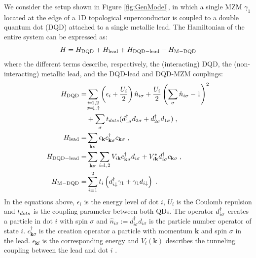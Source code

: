 \documentclass[showpacs,aps,prb,reprint,superscriptaddress]{revtex4-2}
\begin{document}
We consider the setup shown in Figure \ref{fig:GenModel}, in which a single MZM $\gamma_1$ located at the edge of a 1D topological superconductor is coupled to a double quantum dot (DQD) attached to a single metallic lead. The Hamiltonian of the entire system can be expressed as:
%
\begin{equation}
H=H_{\rm DQD}+H_{\rm lead}+H_{\rm DQD-lead}+H_{\rm M-DQD} 
\label{eq:Model}
\end{equation}
%
where the different terms describe, respectively, the (interacting) DQD, the (non-interacting) metallic lead, and the DQD-lead and DQD-MZM couplings:
\begin{align}
    H_{\rm DQD} =& \!  \sum_{\substack{i\!=\! 1,2 \\ \sigma \!=\! \dw , \up }} \left(\epsilon_{i}+\frac{U_i}{2}\right)\hat{n}_{i\sigma} + \frac{U_i}{2}\left(\sum_{\sigma} \hat{n}_{i\sigma}-1\right)^{2} \nonumber \\ 
& + \sum_{\sigma} \tdots(\dann_{1\sigma}  d_{2\sigma}+\dann_{2\sigma}  d_{1\sigma}) \; ,   \nonumber  \\ 
H_{\rm lead} =&  \sum_{\mathbf{k}\sigma }\epsilon_{\mathbf{k}}c_{\mathbf{k}\sigma}^{\dagger}c_{\mathbf{k}\sigma }  \; ,   \nonumber \\ 
H_{\rm DQD-lead} =&  \sum_{\mathbf{k}\sigma }\sum_{i\!=\!1,2 }V_{i\textbf{k}} c_{\mathbf{k}\sigma }^{\dagger}d_{i\sigma}+V^*_{i\textbf{k}} d_{i\sigma}^{\dagger}c_{\mathbf{k}\sigma } \; ,  \nonumber  \\ 
H_{\rm M-DQD} =&  \sum_{i=1}^2t_{i} \left(d_{i\downarrow}^{\dagger}\gamma_{1}+\gamma_{1}d_{i\downarrow}\right) \; .
%
\label{eq:H_DQD} 
\end{align}
%
In the equations above, $\epsilon_{i}$ is the energy level of dot $i$, $U_i$ is the Coulomb repulsion and $t_{dots}$ is the coupling parameter between both QDs. The operator $d^{\dagger}_{i\sigma}$ creates a particle in dot $i$ with spin $\sigma$ and $\hat{n}_{i\sigma}:=d_{i\sigma}^{\dagger}d_{i\sigma}$ is the particle number operator of state $i$.  $c_{\mathbf{k}\sigma }^{\dagger}$ is the creation operator a particle with momentum $\mathbf{k}$ and spin
$\sigma$ in the lead.  $\epsilon_{\mathbf{k}l}$ is the corresponding energy
 and $V_i(\textbf{k})$ describes the tunneling coupling between the lead and dot $i$ . 
\end{document}
